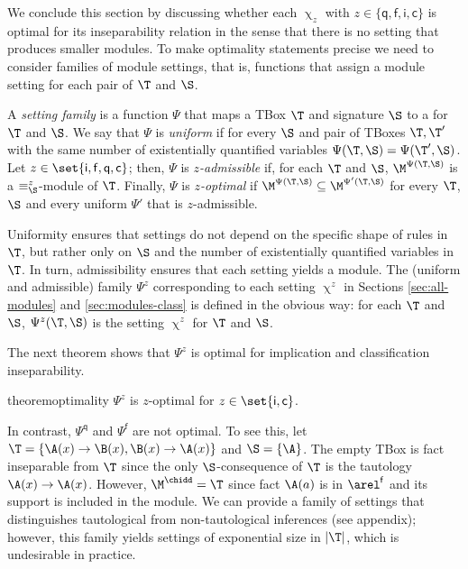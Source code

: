 We conclude this section by discussing whether 
each
$\upchi_z$ with $z \in \{\mathsf{q}, \mathsf{f}, \mathsf{i}, \mathsf{c}\}$
is optimal for its inseparability relation in the sense that there is no
setting that produces smaller modules.
To make optimality statements precise we need to 
consider families of module settings, that is, functions
that assign a module setting for each pair of $\T$ and $\S$.
%
\begin{definition}
  A \emph{setting family} is a function $\Psi$ that maps a TBox
  $\T$ and signature $\S$ to a \bla{} for $\T$ and $\S$. 
  We say that $\Psi$ is \emph{uniform} if for every $\S$ and
  pair of TBoxes $\T,\T'$ with the same number of
  existentially
  quantified variables $\Psi(\T,\S)=\Psi(\T',\S)$.
  Let $z\in\set{\mathsf{i},\mathsf{f},\mathsf{q},\mathsf{c}}$; then,
  $\Psi$ is \emph{$z$-admissible} if, for each
  $\T$ and $\S$, $\M^{\Psi(\T,\S)}$ is a $\equiv^z_\S$-module of $\T$. 
  Finally, $\Psi$ is \emph{$z$-optimal} if
  $\M^{\Psi(\T,\S)}\subseteq\M^{\Psi'(\T,\S)}$ for every $\T$, $\S$
  and every uniform $\Psi'$ that is $z$-admissible.
\end{definition}
%
Uniformity ensures that settings
do not depend on the specific shape of rules in $\T$, but rather only on $\S$
and the number of existentially quantified variables in $\T$.
In turn, admissibility ensures that each setting yields a module.
The (uniform and admissible) family $\Psi^z$
corresponding to each setting  $\upchi^z$
in Sections \ref{sec:all-modules} and \ref{sec:modules-class}
is defined in the obvious way: 
for each $\T$ and $\S$, $\Psi^z(\T,\S)$ is the
setting $\upchi^z$ for $\T$ and $\S$.

The next theorem shows that $\Psi^z$ is optimal for implication and
classification inseparability.
%
\begin{restatable}{theorem}{optimality} \label{thm:optimality} %
  $\Psi^z$ is $z$-optimal for $z\in\set{\mathsf{i},\mathsf{c}}$.
\end{restatable}
%
In contrast, $\Psi^{\mathsf{q}}$ and  $\Psi^{\mathsf{f}}$
are not optimal. To see this, let
$\T = \{ \A(x) \to \B(x), \B(x) \to \A(x)\}$ and $\S = \{\A\}$. 
The empty TBox is fact inseparable from $\T$ since the only $\S$-consequence
of $\T$ is the tautology $\A(x) \to \A(x)$. However, $\M^{\chidd} = \T$ since 
fact $\A(a)$ is in $\arel^{\mathsf{f}}$ and its support is included in the module.
We can provide a family of settings that distinguishes
tautological from non-tautological inferences (see 
appendix);
however, this family yields settings of exponential size in $\vert \T \vert$, which is
undesirable in practice.






